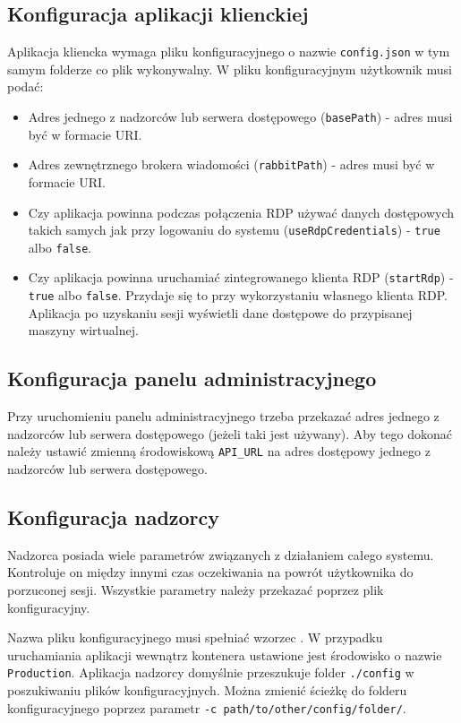 \documentclass[../opis-rozwiazania.tex]{subfiles}
\begin{document}
\subsection{Konfiguracja aplikacji klienckiej}
Aplikacja kliencka wymaga pliku konfiguracyjnego o nazwie \texttt{config.json} w tym samym folderze co plik wykonywalny.
W pliku konfiguracyjnym użytkownik musi podać:
\begin{itemize}
  \item Adres jednego z nadzorców lub serwera dostępowego (\texttt{basePath}) - adres musi być w formacie URI.
  \item Adres zewnętrznego brokera wiadomości (\texttt{rabbitPath}) - adres musi być w formacie URI.
  \item Czy aplikacja powinna podczas połączenia RDP używać danych dostępowych takich samych jak przy logowaniu do systemu (\texttt{useRdpCredentials}) - \texttt{true} albo \texttt{false}.
  \item Czy aplikacja powinna uruchamiać zintegrowanego klienta RDP (\texttt{startRdp}) - \texttt{true} albo \texttt{false}. Przydaje się to przy wykorzystaniu własnego klienta RDP. Aplikacja po uzyskaniu sesji wyświetli dane dostępowe do przypisanej maszyny wirtualnej.
\end{itemize}

\subsection{Konfiguracja panelu administracyjnego}
\label{system_startup.admin_panel_conf}
Przy uruchomieniu panelu administracyjnego trzeba przekazać adres jednego z nadzorców lub serwera dostępowego (jeżeli taki jest używany).
Aby tego dokonać należy ustawić zmienną środowiskową \texttt{API\_URL} na adres dostępowy jednego z nadzorców lub serwera dostępowego.

\subsection{Konfiguracja nadzorcy}
\label{system_startup.overseer_conf}
Nadzorca posiada wiele parametrów związanych z działaniem całego systemu.
Kontroluje on między innymi czas oczekiwania na powrót użytkownika do porzuconej sesji.
Wszystkie parametry należy przekazać poprzez plik konfiguracyjny.

Nazwa pliku konfiguracyjnego musi spełniać wzorzec \texttt{}.
W przypadku uruchamiania aplikacji wewnątrz kontenera ustawione jest środowisko o nazwie \texttt{Production}.
Aplikacja nadzorcy domyślnie przeszukuje folder \texttt{./config} w poszukiwaniu plików konfiguracyjnych.
Można zmienić ścieżkę do folderu konfiguracyjnego poprzez parametr \texttt{-c path/to/other/config/folder/}.
\end{document}
